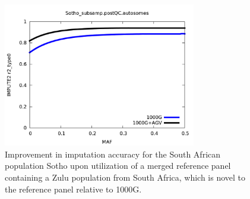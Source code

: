 \begin{figure}
\centering
\includegraphics[trim={0 0 0 0},clip,width=0.75\textwidth]{fig/sotho_imput_improv}
\caption[Improvement in imputation accuracy for the Sotho population across the \gls{MAF} spectrum.]{Improvement in imputation accuracy for the South African population Sotho upon utilization of a merged reference panel containing a Zulu population from South Africa, which is novel to the reference panel relative to \gls{1000G}.}
\label{fig:sotho_imput_improv}
\end{figure}
